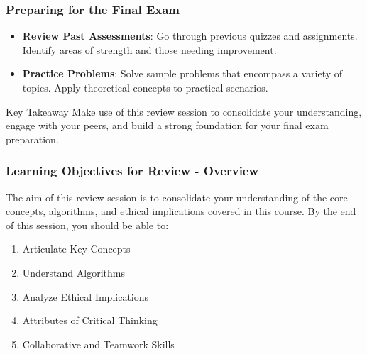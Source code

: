 \documentclass[aspectratio=169]{beamer}
\begin{document}
\begin{frame}[fragile]
    \frametitle{Preparing for the Final Exam}
    \begin{itemize}
        \item \textbf{Review Past Assessments}: Go through previous quizzes and assignments. Identify areas of strength and those needing improvement.
        \item \textbf{Practice Problems}: Solve sample problems that encompass a variety of topics. Apply theoretical concepts to practical scenarios.
    \end{itemize}

    \begin{block}{Key Takeaway}
        Make use of this review session to consolidate your understanding, engage with your peers, and build a strong foundation for your final exam preparation.
    \end{block}
\end{frame}

\begin{frame}[fragile]
    \frametitle{Learning Objectives for Review - Overview}
    The aim of this review session is to consolidate your understanding of the core concepts, algorithms, and ethical implications covered in this course. By the end of this session, you should be able to:
    \begin{enumerate}
        \item Articulate Key Concepts
        \item Understand Algorithms
        \item Analyze Ethical Implications
        \item Attributes of Critical Thinking
        \item Collaborative and Teamwork Skills
    \end{enumerate}
\end{frame}
\end{document}
